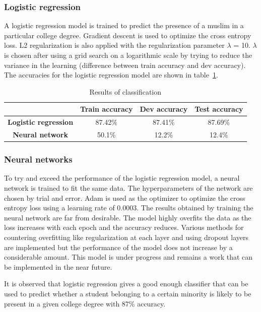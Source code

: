 \subsubsection{Logistic regression}
A logistic regression model is trained to predict the presence of a muslim in a particular college degree. Gradient descent is used to optimize the cross entropy loss. L2 regularization is also applied with the regularization parameter $\lambda$ = 10. $\lambda$ is chosen after using a grid search on a logarithmic scale by trying to reduce the variance in the learning (difference between train accuracy and dev accuracy). The accuracies for the logistic regression model are shown in table~\ref{classification_res}.

\begin{table}[htbp]
\caption{Results of classification}
\label{classification_res}   
\begin{tabular}{|c|c|c|c|}
\hline
\textbf{} & \textbf{Train accuracy} & \textbf{Dev accuracy} & \textbf{Test accuracy} \\\hline
\textbf{Logistic regression} & 87.42\% & 87.41\% & 87.69\% \\\hline
\textbf{Neural network} & 50.1\% & 12.2\% & 12.4\% \\\hline
\end{tabular} 
\end{table}


\subsubsection{Neural networks}
To try and exceed the performance of the logistic regression model, a neural network is trained to fit the same data. The hyperparameters of the network are chosen by trial and error. Adam is used as the optimizer to optimize the cross entropy loss using a learning rate of 0.0003. The results obtained by training the neural network are far from desirable. The model highly overfits the data as the loss increases with each epoch and the accuracy reduces. Various methods for countering overfitting like regularization at each layer and using dropout layers are implemented but the performance of the model does not increase by a considerable amount. This model is under progress and remains a work that can be implemented in the near future. 

It is observed that logistic regression gives a good enough classifier that can be used to predict whether a student belonging to a certain minority is likely to be present in a given college degree with 87\% accuracy.